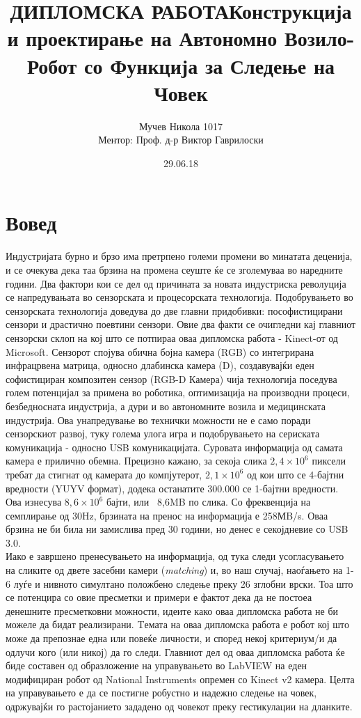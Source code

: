 \documentclass[11pt]{article}
\title{ДИПЛОМСКА РАБОТА\bigbreak \textbf{Конструкција и проектирање  на Автономно Возило-Робот со Функција за Следење на Човек}}
\date{29.06.18}
\author{Мучев Никола 1017%
  \\	Ментор: Проф. д-р Виктор Гаврилоски}
\begin{document}
    \sloppy
    
    \newpage
    \tableofcontents
    \newpage


\section{Вовед}
  Индустријата бурно и брзо има претрпено големи промени во минатата деценија, и се очекува дека таа брзина на промена сеуште ќе се зголемуваа во наредните години. Два фактори кои се дел од причината за новата индустриска револуција се напредувањата во сензорската и процесорската технологија.\bigbreak
  Подобрувањето во сензорската технологија доведува до две главни придобивки: пософистицирани сензори и драстично поевтини сензори. Овие два факти се очигледни кај главниот сензорски склоп на кој што се потпираа оваа дипломска работа - Kinect-от од Microsoft. Сензорот спојува обична бојна камера (RGB) со интегрирана инфрацрвена матрица, односно длабинска камера (D), создавувајќи еден софистициран композитен сензор (RGB-D Камера) чија технологија поседува голем потенцијал за примена во роботика, оптимизација на производни процеси, безбедносната индустрија, а дури и во автономните возила и медицинската индустрија.
  \bigbreak
  Ова унапредување во технички можности не е само поради сензорскиот развој, туку голема улога игра и подобрувањето на сериската комуникација - односно USB комуникацијата.
  Суровата информација од самата камера е прилично обемна. Прецизно кажано, за секоја слика $2,4 \times 10^6$ пиксели требат да стигнат од камерата до компјутерот, $2,1 \times 10^6$ од кои што се 4-бајтни вредности (YUYV формат), додека останатите 300.000 се 1-бајтни вредности. Ова изнесува $8,6 \times 10^6$ бајти, или ~8,6MB по слика. Со фреквенција на семплирање од 30Hz, брзината на пренос на информација е 258МB/s. Оваа брзина не би била ни замислива пред 30 години, но денес е секојдневие со USB 3.0.
  \\
  Иако е завршено пренесувањето на информација, од тука следи усогласувањето на сликите од двете засебни камери (\textit{matching}) и, во наш случај, наоѓањето на 1-6 луѓе и нивното симултано положбено следење преку 26 зглобни врски.
  Тоа што се потенцира со овие пресметки и примери е фактот дека да не постоеа денешните пресметковни можности, идеите како оваа дипломска работа не би можеле да бидат реализирани.
  \bigbreak
  Tемата на оваа дипломска работа е робот кој што може да препознае една или повеќе личности, и според некој критериум/и да одлучи кого (или никој) да го следи.
  Главниот дел од оваа дипломска работа ќе биде составен од образложение на управувањето во LabVIEW на еден модифициран робот од National Instruments опремен со Kinect v2 камера. Целта на управувањето е да се постигне робустно и надежно следење на човек, одржувајќи го растојанието зададено од човекот преку гестикулации на дланките.
  \\
\end{document}

